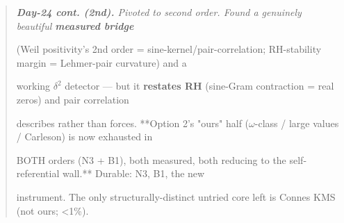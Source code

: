 \documentclass[10pt]{article}
\begin{document}
\begin{quote}\itshape
\textbf{Day-24 cont. (2nd).} Pivoted to second order. Found a genuinely beautiful \textbf{measured bridge}\par
(Weil positivity's 2nd order = sine-kernel/pair-correlation; RH-stability margin = Lehmer-pair curvature) and a\par
working $\delta^2$ detector --- but it \textbf{restates RH} (sine-Gram contraction = real zeros) and pair correlation\par
describes rather than forces. **Option 2's "ours" half (\ensuremath{\omega}-class / large values / Carleson) is now exhausted in\par
BOTH orders (N3 + B1), both measured, both reducing to the self-referential wall.** Durable: N3, B1, the new\par
instrument. The only structurally-distinct untried core left is Connes KMS (not ours; <1\%).\par
\end{quote}
\end{document}

